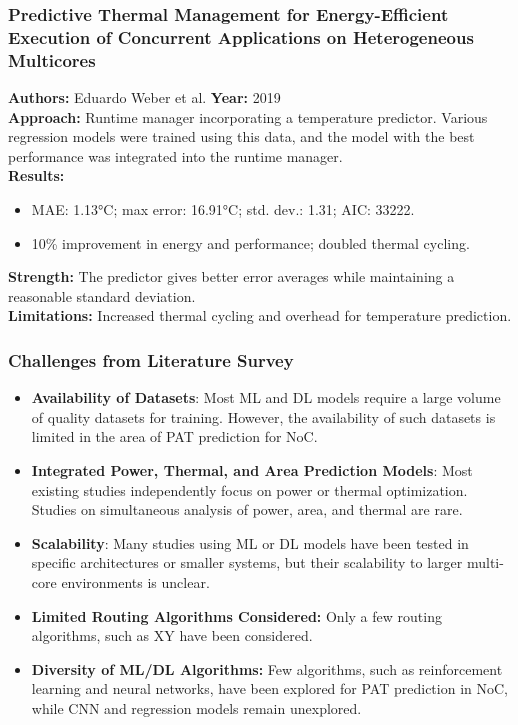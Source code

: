 \documentclass{beamer}
\begin{document}
\begin{frame}
\frametitle{Predictive Thermal Management for Energy-Efficient Execution of Concurrent Applications on Heterogeneous Multicores}

\textbf{Authors:} Eduardo Weber et al.
\textbf{Year:} 2019 \\[10pt]

\textbf{Approach:} Runtime manager incorporating a temperature predictor. Various regression models were trained using this data, and the model with the best performance was integrated into the runtime manager. \\[10pt]

\textbf{Results:}
\begin{itemize}
\item MAE: 1.13°C; max error: 16.91°C; std. dev.: 1.31; AIC: 33222.
\item 10\% improvement in energy and performance; doubled thermal cycling.
\end{itemize}

\textbf{Strength:} The predictor gives better error averages while maintaining a reasonable standard deviation. \\[10pt]

\textbf{Limitations:} Increased thermal cycling and overhead for temperature prediction. \\[10pt]

\end{frame}



\begin{frame}
\frametitle{Challenges from Literature Survey}

\begin{itemize}
    \item \textbf{Availability of Datasets}: Most ML and DL models require a large volume of quality datasets for training. However, the availability of such datasets is limited in the area of PAT prediction for NoC.
  
    \item \textbf{Integrated Power, Thermal, and Area Prediction Models}: Most existing studies independently focus on power or thermal optimization. Studies on simultaneous analysis of power, area, and thermal are rare.
  
    \item \textbf{Scalability}: Many studies using ML or DL models have been tested in specific architectures or smaller systems, but their scalability to larger multi-core environments is unclear.

    \item \textbf{Limited Routing Algorithms Considered:} Only a few routing algorithms, such as XY have been considered. 

    \item \textbf{Diversity of ML/DL Algorithms:} Few algorithms, such as reinforcement learning and neural networks, have been explored for PAT prediction in NoC, while CNN and regression models remain unexplored.
\end{itemize}
\end{frame}
\end{document}
